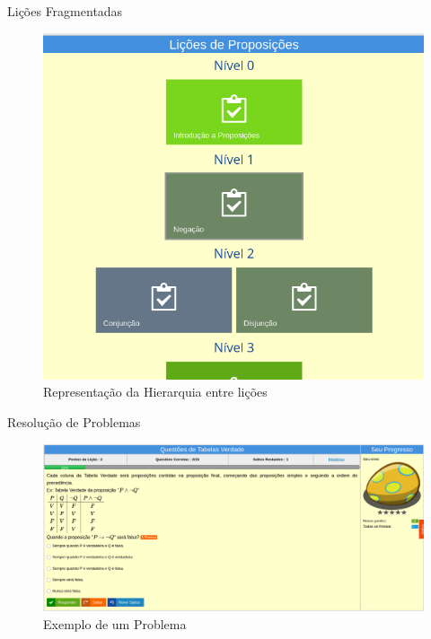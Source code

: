 \documentclass[10pt]{beamer}
\begin{document}
\begin{frame}{Li\c{c}\~oes Fragmentadas}
	\begin{figure}[H]
		\centering
		\caption{Representa\c{c}\~ao da Hierarquia entre li\c{c}\~oes}
		 \begin{minipage}[b]{0.6\textwidth}
			\includegraphics[width=\textwidth]{figuras/licoes.png}
		\end{minipage}
	\end{figure}
\end{frame}

\begin{frame}{Resolu\c{c}\~ao de Problemas}
	\begin{figure}[H]
		\centering
		 \caption{Exemplo de um Problema}
		 \begin{minipage}[b]{1\textwidth}
			\includegraphics[width=\textwidth]{figuras/resolucao_problemas.png}
		\end{minipage}
	\end{figure}
\end{frame}
\end{document}
